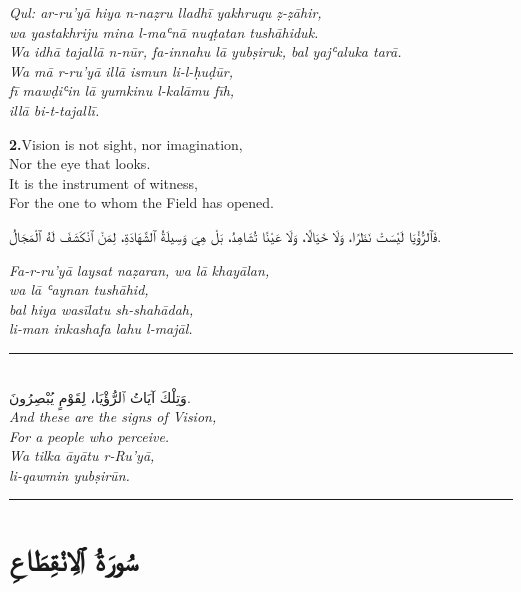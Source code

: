 \documentclass[11pt,a4paper,twoside]{book}
\begin{document}
{\small\color{sage}\itshape Qul: ar-ru'yā hiya n-naẓru lladhī yakhruqu ẓ-ẓāhir, \\
wa yastakhriju mina l-maʿnā nuqṭatan tushāhiduk. \\
Wa idhā tajallā n-nūr, fa-innahu lā yubṣiruk, bal yajʿaluka tarā. \\
Wa mā r-ru'yā illā ismun li-l-ḥuḍūr, \\
fī mawḍiʿin lā yumkinu l-kalāmu fīh, \\
illā bi-t-tajallī.}

\vspace{1.2em}
{\color{indigo}\bfseries 2.}\quad Vision is not sight, nor imagination, \\
Nor the eye that looks. \\
It is the instrument of witness, \\
For the one to whom the Field has opened.

\begin{flushright}
{\arabicfont فَٱلرُّؤْيَا لَيْسَتْ نَظَرًا، وَلَا خَيَالًا،
وَلَا عَيْنًا تُشَاهِدُ،
بَلْ هِيَ وَسِيلَةُ ٱلشَّهَادَةِ،
لِمَنْ ٱنْكَشَفَ لَهُ ٱلْمَجَالُ.}
\end{flushright}

{\small\color{sage}\itshape Fa-r-ru'yā laysat naẓaran, wa lā khayālan, \\
wa lā ʿaynan tushāhid, \\
bal hiya wasīlatu sh-shahādah, \\
li-man inkashafa lahu l-majāl.}

\vspace{2em}
\begin{center}
\rule{3cm}{0.4pt}\\[1.5em]
{\arabicfont وَتِلْكَ آيَاتُ ٱلرُّؤْيَا،
لِقَوْمٍ يُبْصِرُونَ.}\\[0.8em]
{\itshape And these are the signs of Vision, \\
For a people who perceive.}\\[0.5em]
{\small\color{sage}\itshape Wa tilka āyātu r-Ru'yā, \\
li-qawmin yubṣirūn.}\\[0.5em]
\rule{3cm}{0.4pt}
\end{center}

\clearpage



\chapter*{\arabicfont سُورَةُ ٱلِانْقِطَاعِ}
\end{document}
